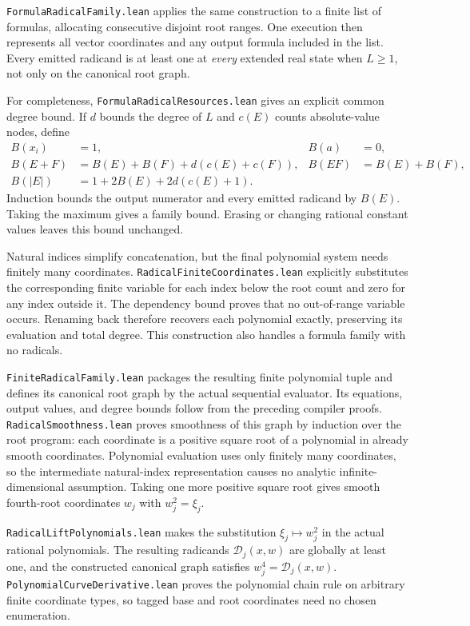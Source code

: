 \documentclass[11pt]{article}
\newcommand{\code}[1]{{\small\nolinkurl{#1}}}
\begin{document}
\code{FormulaRadicalFamily.lean} applies the same construction to a
finite list of formulas, allocating consecutive disjoint root ranges.
One execution then represents all vector coordinates and any output
formula included in the list. Every emitted radicand is at least one
at \emph{every} extended real state when $L\ge1$, not only on the
canonical root graph.

For completeness, \code{FormulaRadicalResources.lean} gives an explicit
common degree bound. If $d$ bounds the degree of $L$ and $c(E)$ counts
absolute-value nodes, define
\begin{align*}
 B(x_i)&=1, & B(a)&=0,\\
 B(E+F)&=B(E)+B(F)+d(c(E)+c(F)),
 &B(EF)&=B(E)+B(F),\\
 B(|E|)&=1+2B(E)+2d(c(E)+1).
\end{align*}
Induction bounds the output numerator and every emitted radicand by
$B(E)$. Taking the maximum gives a family bound. Erasing or changing
rational constant values leaves this bound unchanged.

Natural indices simplify concatenation, but the final polynomial system
needs finitely many coordinates. \code{RadicalFiniteCoordinates.lean}
explicitly substitutes the corresponding finite variable for each index
below the root count and zero for any index outside it. The dependency
bound proves that no out-of-range variable occurs. Renaming back therefore
recovers each polynomial exactly, preserving its evaluation and total
degree. This construction also handles a formula family with no radicals.

\code{FiniteRadicalFamily.lean} packages the resulting finite polynomial
tuple and defines its canonical root graph by the actual sequential
evaluator. Its equations, output values, and degree bounds follow from
the preceding compiler proofs. \code{RadicalSmoothness.lean} proves
smoothness of this graph by induction over the root program: each
coordinate is a positive square root of a polynomial in already smooth
coordinates. Polynomial evaluation uses only finitely many coordinates,
so the intermediate natural-index representation causes no analytic
infinite-dimensional assumption. Taking one more positive square root
gives smooth fourth-root coordinates $w_j$ with $w_j^2=\xi_j$.

\code{RadicalLiftPolynomials.lean} makes the substitution
$\xi_j\mapsto w_j^2$ in the actual rational polynomials. The resulting
radicands $\mathcal D_j(x,w)$ are globally at least one, and the
constructed canonical graph satisfies $w_j^4=\mathcal D_j(x,w)$.
\code{PolynomialCurveDerivative.lean} proves the polynomial chain rule
on arbitrary finite coordinate types, so tagged base and root coordinates
need no chosen enumeration.
\end{document}
